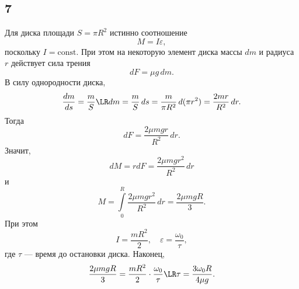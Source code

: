 \subsection{7}

Для диска площади $S=\pi R^2$ истинно соотношение
\[
M=I\varepsilon,
\]
поскольку $I=\text{const}$. При этом на некоторую элемент диска массы $dm$ и радиуса $r$ действует сила трения
\[
dF=\mu g\,dm.
\]
В силу однородности диска,
\[
\frac{dm}{ds}=\frac{m}{S}\LR dm=\frac{m}{S}\,ds=\frac{m}{\pi R^2}\,d(\pi r^2)=\frac{2mr}{R^2}\,dr.
\]
Тогда
\[
dF=\frac{2\mu mgr}{R^2}\,dr.
\]
Значит,
\[
dM=rdF=\frac{2\mu mgr^2}{R^2}\,dr
\]
и
\[
M=\int\limits_0^R\frac{2\mu mgr^2}{R^2}\,dr=\frac{2\mu mgR}{3}.
\]
При этом
\[
I=\frac{mR^2}{2},\quad\varepsilon=\frac{\omega_0}{\tau},
\]
где $\tau$ --- время до остановки диска. Наконец,
\[
\frac{2\mu mgR}{3}=\frac{mR^2}{2}\cdot\frac{\omega_0}{\tau}\LR\tau=\frac{3\omega_0R}{4\mu g}.
\]
